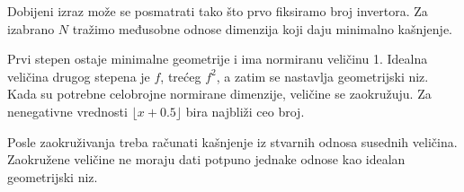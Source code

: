 Dobijeni izraz može se posmatrati tako što prvo fiksiramo broj invertora. Za izabrano $N$ tražimo međusobne odnose dimenzija koji daju minimalno kašnjenje.

Prvi stepen ostaje minimalne geometrije i ima normiranu veličinu 1. Idealna veličina drugog stepena je $f$, trećeg $f^2$, a zatim se nastavlja geometrijski niz. Kada su potrebne celobrojne normirane dimenzije, veličine se zaokružuju. Za nenegativne vrednosti $\lfloor x+0.5\rfloor$ bira najbliži ceo broj.

Posle zaokruživanja treba računati kašnjenje iz stvarnih odnosa susednih veličina. Zaokružene veličine ne moraju dati potpuno jednake odnose kao idealan geometrijski niz.
